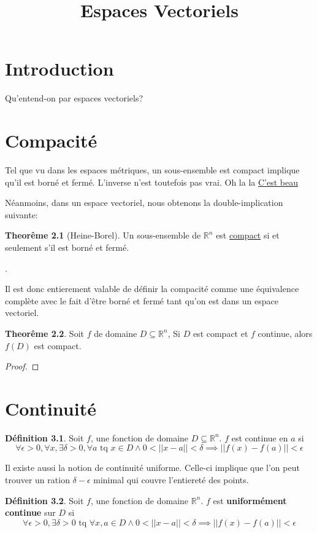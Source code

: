 \documentclass[12pt]{book}
\title{Espaces Vectoriels}
\let\Bbb\mathbb
\theoremstyle{definition}
\newtheorem{definition}{Définition}[section]
\newtheorem{theorem}{Theorême}[section]
\begin{document}
\chapter{Introduction}
Qu'entend-on par espaces vectoriels?

\chapter{Compacité}
Tel que vu dans les espaces métriques, un sous-ensemble est compact implique qu'il est borné et fermé.
L'inverse n'est toutefois pas vrai. Oh la la \hyperref[topologie/def:convergence_metrique]{C'est beau}

Néanmoins, dans un espace vectoriel, nous obtenons la double-implication suivante:
\begin{theorem}[Heine-Borel]
    \label{thm:heine_borel} Un sous-ensemble de $\Bbb R^n$ est \hyperref[def:compacite]{compact} si et seulement s'il est 
    borné et fermé.
\end{theorem}.

Il est donc entierement valable de définir la compacité comme une équivalence complète avec le fait d'être borné et fermé tant 
qu'on est dans un espace vectoriel.

\begin{theorem}
    \label{thm:compact_implique_compact}
    Soit $f$ de domaine $D \subseteq \Bbb R^n$, Si $D$ est compact et $f$ continue, alors $f(D)$ est compact.
\end{theorem}

\begin{proof}
\end{proof}

\chapter{Continuité}
\begin{definition}
    \label{def:continuite}
    Soit $f$, une fonction de domaine $D \subseteq \Bbb R^n$. $f$ est continue en $a$ si 
    $$\forall \epsilon > 0, \forall x, \exists \delta > 0, \forall a \text{ tq } x \in D \land 0 < ||x - a|| < \delta \implies || f(x) - f(a) || < \epsilon$$
\end{definition}

Il existe aussi la notion de continuité uniforme. Celle-ci implique que l'on peut trouver un ration $\delta-\epsilon$ minimal qui couvre
l'entiereté des points.
\begin{definition}
    \label{def:continuite_uniforme}
    Soit $f$, une fonction de domaine $\Bbb R^n$. $f$ est \textbf{uniformément continue} sur $D$ si 
    $$\forall \epsilon > 0, \exists \delta > 0 \text{ tq } \forall x, a \in D \land 0 < ||x - a|| < \delta \implies || f(x) - f(a) || < \epsilon$$
\end{definition}
\end{document}
